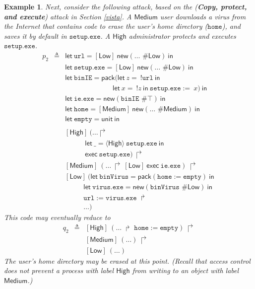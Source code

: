 \documentclass{sigplanconf}
\newcommand{\eval}[3]{\mathsf{let}~#1=#2~\mathsf{in}~#3}
\newtheorem{example}[definition]{Example}
\begin{document}
\begin{example}\label{eg:2} \rm
Next, consider the following attack, based on the ({\bf Copy, protect, and execute}) attack in Section \ref{vista}. 
A $\mathsf{Medium}$ user 
downloads a virus from the Internet that contains code to erase the user's home directory ($\mathtt{home}$), and saves it by default in $\mathtt{setup.exe}$. A $\mathsf{High}$
administrator protects and executes $\mathtt{setup.exe}$.
\begin{eqnarray*}
p_2\!\!\!\!&\triangleq&\!\!\!\eval{\mathtt{url}}{[\mathsf{Low}]~\mathsf{new}(\dots\mbox{ \# }\mathsf{Low})}\\
\!\!\!\!&\!\!\!\!&\!\!\!\eval{\mathtt{setup.exe}}{[\mathsf{Low}]~\mathsf{new}(\dots\mbox{ \# }\mathsf{Low})}\\
\!\!\!\!&\!\!\!\!&\!\!\!\eval{\mathtt{binIE}}{\mathsf{pack}(\eval z {~!\mathtt{url}}\\
\!\!\!\!&\!\!\!\!&\!\!\!~~~~~~~~~~~~~~~~~~~~~~~~~\:\:\:\:\:\:\eval x{~!z}\mathtt{setup.exe}:=~x)}\\
\!\!\!\!&\!\!\!\!&\!\!\!\eval{\mathtt{ie.exe}}{\mathsf{new}(\mathtt{binIE}\mbox{ \# }\top)}\\
\!\!\!\!&\!\!\!\!&\!\!\!\eval{\mathtt{home}}{[\mathsf{Medium}]~\mathsf{new}(\dots\mbox{ \# }\mathsf{Medium})}\\
\!\!\!\!&\!\!\!\!&\!\!\!\eval{\mathtt{empty}}{\mathsf{unit}}\\
\\
\!\!\!\!&\!\!\!\! &\!\!\![\mathsf{High}]~ (\dots \Rsh \\
\!\!\!\!&\!\!\!\! &\!\!\!~~~~~~~~~~~~\:\eval \_ {\langle\mathsf{High}\rangle~\mathtt{setup.exe}}\\
\!\!\!\!&\!\!\!\! &\!\!\!~~~~~~~~~~~~\:\mathsf{exec}~\mathtt{setup.exe})~\Rsh \\
\!\!\!\!&\!\!\!\! &\!\!\![\mathsf{Medium}]~ (\dots ~\Rsh~ [\mathsf{Low}]~
\mathsf{exec}~\mathtt{ie.exe}) ~\Rsh\\
\!\!\!\!&\!\!\!\! &\!\!\![\mathsf{Low}]~ (\eval{\mathtt{binVirus}}{\mathsf{pack}(\mathtt{home}
:= \mathtt{empty})}\\
\!\!\!\!&\!\!\!\! &\!\!\!~~~~~~~~\:\:\:\:\eval{\mathtt{virus.exe}}{\mathsf{new}(\mathtt{binVirus}\mbox{ \# }\mathsf{Low})} \\
\!\!\!\!&\!\!\!\!&\!\!\!~~~~~~~~\:\:\:\:\mathtt{url} := 
\mathtt{virus.exe}~\Rsh \\
\!\!\!\!&\!\!\!\!&\!\!\!~~~~~~~~\:\:\:\:\dots)
\end{eqnarray*}
This code may eventually reduce to 
\begin{eqnarray*}
q_2 \!\!\!& \triangleq &\!\!\![\mathsf{High}]~ (\dots~\Rsh~\mathtt{home}
:= \mathtt{empty})~\Rsh \\
&&\!\!\![\mathsf{Medium}]~ (\dots)~\Rsh \\
&&\!\!\![\mathsf{Low}]~ (\dots)
\end{eqnarray*}
The user's home directory may be erased at this point.  (Recall that access control does not prevent a process with label $\mathsf{High}$ from writing to an
object with label $\mathsf{Medium}$.)
\end{example}
\end{document}
